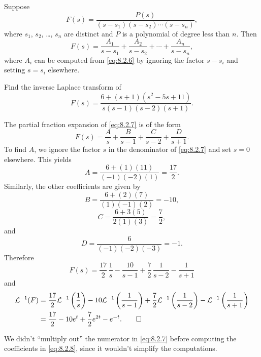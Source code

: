 \begin{theorem}\label{thmtype:8.2.2}
Suppose
\begin{equation}\label{eq:8.2.6}
F(s)=\frac{P(s)}{(s-s_1)(s-s_2)\cdots(s-s_n)},
\end{equation}
where $s_1$, $s_2$, \dots, $s_n$ are distinct  and $P$ is a polynomial of
degree less than $n$.  Then
\[
F(s)=\frac{A_1}{s-s_1}+\frac{A_2}{s-s_2}+\cdots+\frac{A_n}{s-s_n},\]
where $A_i$ can be computed from \eqref{eq:8.2.6}
by ignoring the factor $s-s_i$  and setting $s=s_i$ elsewhere.
\end{theorem}

\begin{example}\label{example:8.2.5}
Find the inverse Laplace transform of
\begin{equation}\label{eq:8.2.7}
F(s)=\frac{6+(s+1)(s^2-5s+11)}{s(s-1)(s-2)(s+1)}.
\end{equation}
\end{example}

\begin{solution}
The partial fraction expansion of  \eqref{eq:8.2.7} is of the form
\begin{equation}\label{eq:8.2.8}
F(s)=\frac{A}{s}+\frac{B}{s-1}+\frac{C}{s-2}+\frac{D}{s+1}.
\end{equation}
To find $A$, we ignore the factor $s$ in the denominator of
\eqref{eq:8.2.7} and set $s=0$ elsewhere. This yields
\[
A=\frac{6+(1)(11)}{(-1)(-2)(1)}=\frac{17}{2}.
\]
Similarly, the other coefficients are given by
\[
B=\frac{6+(2)(7)}{(1)(-1)(2)}=-10,
\]
\[
C=\frac{6+3(5)}{2(1)(3)}=\frac{7}{2},
\]
and
\[
D=\frac{6}{(-1)(-2)(-3)}=-1.
\]
Therefore
\[
F(s)=\frac{17}{2}\,\frac{1}{s}-\frac{10}{s-1}+\frac{7}{2}\,\frac{1}{s-2}-\frac{1}{s+1}
\]
and
\begin{align*}
{\mathcal L}^{-1}(F)
&=\frac{17}{2}{\mathcal L}^{-1}\left(\frac{1}{s}\right)
-10{\mathcal L}^{-1}\left(\frac{1}{s-1}\right)
+\frac{7}{2}{\mathcal L}^{-1}\left(\frac{1}{s-2}\right)
-{\mathcal L}^{-1}\left(\frac{1}{s+1}\right)\\
&= \frac{17}{2}-10e^t+\frac{7}{2}e^{2t}-e^{-t}.\qedhere
\end{align*}
\end{solution}

\begin{remark*}
We didn't ``multiply out'' the numerator in
\eqref{eq:8.2.7} before
computing the coefficients in \eqref{eq:8.2.8}, since
 it wouldn't simplify the computations.
\end{remark*}

